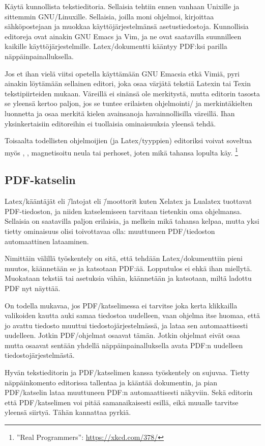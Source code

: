 Käytä kunnollista tekstieditoria. Sellaisia tehtiin ennen vanhaan
Unixille ja sittemmin GNU/Linuxille. Sellaisia, joilla moni ohjelmoi,
kirjoittaa sähköpostejaan ja muokkaa käyttöjärjestelmänsä
asetustiedostoja. Kunnollisia editoreja ovat ainakin GNU Emacs ja Vim,
ja ne ovat saatavilla suunnilleen kaikille käyttöjärjestelmille.
Latex\-/dokumentti kääntyy PDF:ksi parilla näppäinpainalluksella.

Jos et ihan vielä viitsi opetella käyttämään GNU Emacsia etkä Vimiä,
pyri ainakin löytämään sellainen editori, joka osaa värjätä tekstiä
Latexin tai Texin tekstipiirteiden mukaan. Väreillä ei sinänsä ole
merkitystä, mutta editorin tasosta se yleensä kertoo paljon, jos se
tuntee erilaisten ohjelmointi\-/{} ja merkintäkielten luonnetta ja osaa
merkitä kielen avainsanoja havainnollisilla väreillä. Ihan
yksinkertaisiin editoreihin ei tuollaisia ominaisuuksia yleensä tehdä.

Toisaalta todellisten ohjelmoijien (ja Latex\-/tyyppien) editoriksi
voivat soveltua myös , , magnetisoitu
neula tai perhoset, joten mikä tahansa lopulta käy.%
\footnote{''Real Programmers'': \url{https://xkcd.com/378/}}

\subsection{PDF-katselin}

Latex\-/kääntäjät eli \=/latojat eli \=/moottorit kuten Xelatex ja
Lualatex tuottavat PDF-tiedoston, ja niiden katselemiseen tarvitaan
tietenkin oma ohjelmansa. Sellaisia on saatavilla paljon erilaisia, ja
melkein mikä tahansa kelpaa, mutta yksi tietty ominaisuus olisi
toivottavaa olla: muuttuneen PDF\-/tiedoston automaattinen lataaminen.

Nimittäin välillä työskentely on sitä, että tehdään Latex\-/dokumenttiin
pieni muutos, käännetään se ja katsotaan PDF:ää. Lopputulos ei ehkä ihan
miellytä. Muokataan tekstiä tai asetuksia vähän, käännetään ja
katsotaan, miltä ladottu PDF nyt näyttää.

On todella mukavaa, jos PDF\-/katselimessa ei tarvitse joka kerta
klikkailla valikoiden kautta auki samaa tiedostoa uudelleen, vaan
ohjelma itse huomaa, että jo avattu tiedosto muuttui
tiedostojärjestelmässä, ja lataa sen automaattisesti uudelleen. Jotkin
PDF\-/ohjelmat osaavat tämän. Jotkin ohjelmat eivät osaa mutta osaavat
sentään yhdellä näppäinpainalluksella avata PDF:n uudelleen
tiedostojärjestelmästä.

Hyvän tekstieditorin ja PDF\-/katselimen kanssa työskentely on sujuvaa.
Tietty näppäinkomento editorissa tallentaa ja kääntää dokumentin, ja
pian PDF\-/katselin lataa muuttuneen PDF:n automaattisesti näkyviin.
Sekä editorin että PDF\-/katselimen voi pitää sa\-man\-aikai\-ses\-ti
esillä, eikä muualle tarvitse yleensä siirtyä. Tähän kannattaa pyrkiä.

